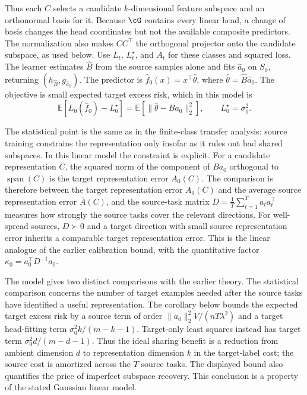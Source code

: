 \documentclass[11pt,twoside]{article}
\newcommand{\E}{\mathbb E}
\theoremstyle{definition}
\theoremstyle{remark}
\begin{document}
Thus each $C$ selects a candidate $k$-dimensional feature subspace and an
orthonormal basis for it. Because $\cG$ contains every linear head, a change
of basis changes the head coordinates but not the available composite
predictors. The normalization also makes $CC^\top$ the orthogonal projector
onto the candidate subspace, as used below.
Use $L_t$, $L_t^\star$, and $A_t$ for these classes and squared loss.
The learner estimates $\widehat B$ from the source samples alone and fits
$\widehat a_0$ on $S_0$, returning $(h_{\widehat B},g_{\widehat a_0})$.
The predictor is $\widehat f_0(x)=x^\top\widehat\theta$, where
$\widehat\theta=\widehat B\widehat a_0$. The objective is small expected
target excess risk, which in this model is
\begin{equation}
 \E[L_0(\widehat f_0)-L_0^\star]
 =\E[\|\widehat\theta-Ba_0\|_2^2],
 \qquad L_0^\star=\sigma_0^2.
 \label{eq:linear-target-objective}
\end{equation}

The statistical point is the same as in the finite-class transfer analysis: source
training constrains the representation only insofar as it rules out bad shared
subspaces. In this linear model the constraint is explicit. For a candidate
representation $C$, the squared norm of the component of $Ba_0$ orthogonal to
$\operatorname{span}(C)$ is the target representation error $A_0(C)$. The comparison is
therefore between the target representation error $A_0(C)$ and the average source
representation error $\overline A(C)$, and the source-task matrix
$D=\frac1T\sum_{t=1}^Ta_ta_t^\top$ measures how strongly the source tasks cover the
relevant directions. For well-spread sources, $D\succ0$ and a target direction with
small source representation error inherits a comparable target representation
error. This is the linear analogue of the earlier calibration bound, with the
quantitative factor $\kappa_0=a_0^\top D^{-1}a_0$.

The model gives two distinct comparisons with the earlier theory. The
statistical comparison concerns the number of target examples needed after the
source tasks have identified a useful representation. The corollary below
bounds the expected target excess risk by a source term of order
$\|a_0\|_2^2V/(nT\lambda^2)$ and a target head-fitting term
$\sigma_0^2 k/(m-k-1)$. Target-only least squares instead has target term
$\sigma_0^2 d/(m-d-1)$. Thus the ideal sharing benefit is a reduction from
ambient dimension $d$ to representation dimension $k$ in the target-label cost;
the source cost is amortized across the $T$ source tasks. The displayed bound
also quantifies the price of imperfect subspace recovery. This conclusion is a
property of the stated Gaussian linear model.
\end{document}
